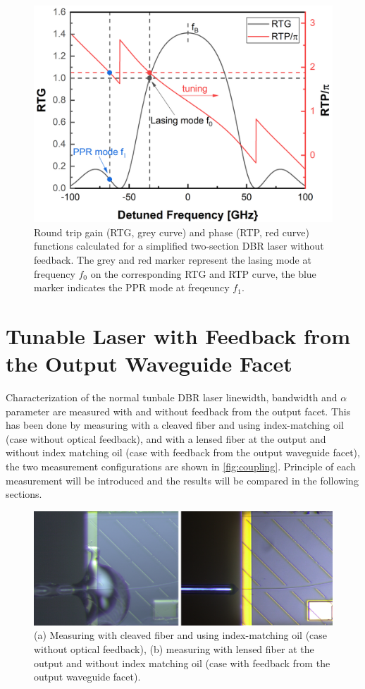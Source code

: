 \begin{figure}[ht]
    \centering
    \includegraphics[width=.7\linewidth]{figures/PP_resonance_operation_principle.png}
    \caption{Round trip gain (RTG, grey curve) and phase (RTP, red curve) functions calculated for a simplified two-section DBR laser without feedback. The grey and red marker represent the lasing mode at frequency $f_0$ on the corresponding RTG and RTP curve, the blue marker indicates the PPR mode at freqeuncy $f_1$.}
    \label{fig:PP_resonance_operation_principle}
\end{figure}

\chapter{Tunable Laser with Feedback from the Output Waveguide Facet}\label{ch:Laser_with_feedback_from_facet}
Characterization of the normal tunbale DBR laser linewidth, bandwidth and $\alpha$ parameter are measured with and without feedback from the output facet. This has been done by measuring with a cleaved fiber and using index-matching oil (case without optical feedback), and with a lensed fiber at the output and without index matching oil (case with feedback from the output waveguide facet), the two measurement configurations are shown in \autoref{fig:coupling}. Principle of each measurement will be introduced and the results will be compared in the following sections.

\begin{figure}[ht]
    \centering
    \includegraphics[width=\linewidth]{figures/coupling.png}
    \caption{(a) Measuring with cleaved fiber and using index-matching oil (case without optical feedback), (b) measuring with lensed fiber at the output and without index matching oil (case with feedback from the output waveguide facet).}
    \label{fig:coupling}
\end{figure}

